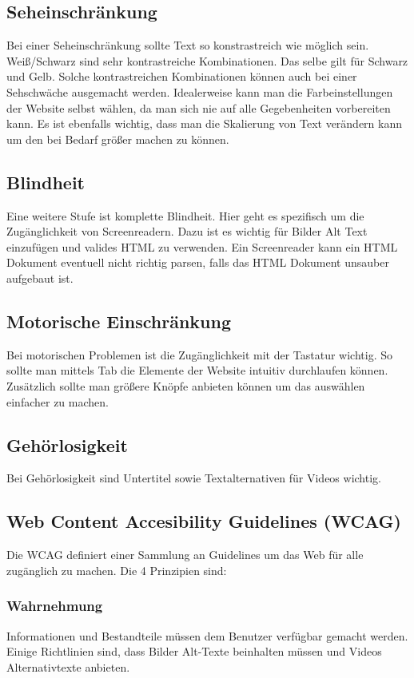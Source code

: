 \documentclass{article}
\begin{document}
\begin{itemize}
	\subsection{Seheinschränkung}
	Bei einer Seheinschränkung sollte Text so konstrastreich wie möglich sein. Weiß/Schwarz sind sehr kontrastreiche Kombinationen. Das selbe gilt für Schwarz und Gelb. Solche kontrastreichen Kombinationen können auch bei einer Sehschwäche ausgemacht werden. Idealerweise kann man die Farbeinstellungen der Website selbst wählen, da man sich nie auf alle Gegebenheiten vorbereiten kann. Es ist ebenfalls wichtig, dass man die Skalierung von Text verändern kann um den bei Bedarf größer machen zu können.
	\subsection{Blindheit}
	Eine weitere Stufe ist komplette Blindheit. Hier geht es spezifisch um die Zugänglichkeit von Screenreadern. Dazu ist es wichtig für Bilder Alt Text einzufügen und valides HTML zu verwenden. Ein Screenreader kann ein HTML Dokument eventuell nicht richtig parsen, falls das HTML Dokument unsauber aufgebaut ist.
	\subsection{Motorische Einschränkung}
	Bei motorischen Problemen ist die Zugänglichkeit mit der Tastatur wichtig. So sollte man mittels Tab die Elemente der Website intuitiv durchlaufen können. Zusätzlich sollte man größere Knöpfe anbieten können um das auswählen einfacher zu machen.
	\subsection{Gehörlosigkeit}
	Bei Gehörlosigkeit sind Untertitel sowie Textalternativen für Videos wichtig.
	\subsection{Web Content Accesibility Guidelines (WCAG)}
	Die WCAG definiert einer Sammlung an Guidelines um das Web für alle zugänglich zu machen. Die 4 Prinzipien sind:
	\subsubsection{Wahrnehmung}
	Informationen und Bestandteile müssen dem Benutzer verfügbar gemacht werden. Einige Richtlinien sind, dass Bilder Alt-Texte beinhalten müssen und Videos Alternativtexte anbieten.

\end{itemize}
\end{document}
